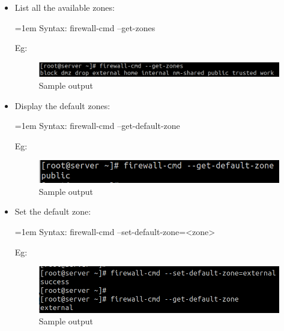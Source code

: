 \setlength{\columnsep}{3pt}
\begin{flushleft}

	\begin{itemize}
		\item List all the available zones:
		\begin{tcolorbox}[breakable,notitle,boxrule=1pt,colback=pink,colframe=pink]
			\color{black}
			\font=1em
			Syntax: firewall-cmd --get-zones
			\font=4pt
		\end{tcolorbox}	
		Eg:
		\begin{figure}[h!]
			\centering
			\includegraphics[scale=0.4]{content/chapter2/images/zones.png}
			\caption{Sample output}
			\label{fig:zones}
		\end{figure}
		
		\bigskip
		\bigskip
		
		\item Display the default zones:
		\begin{tcolorbox}[breakable,notitle,boxrule=1pt,colback=pink,colframe=pink]
			\color{black}
			\font=1em
			Syntax: firewall-cmd --get-default-zone
			\font=4pt
		\end{tcolorbox}	
		Eg:
		\begin{figure}[h!]
			\centering
			\includegraphics[scale=0.5]{content/chapter2/images/zones2.png}
			\caption{Sample output}
			\label{fig:zones2}
		\end{figure}

		\bigskip
		\bigskip

		\item Set the default zone:
		\begin{tcolorbox}[breakable,notitle,boxrule=1pt,colback=pink,colframe=pink]
			\color{black}
			\font=1em
			Syntax: firewall-cmd --set-default-zone=<zone>
			\font=4pt
		\end{tcolorbox}	
		Eg:
		\begin{figure}[h!]
			\centering
			\includegraphics[scale=0.45]{content/chapter2/images/zones3.png}
			\caption{Sample output}
			\label{fig:zones3}
		\end{figure}


\end{itemize}
\end{flushleft}
